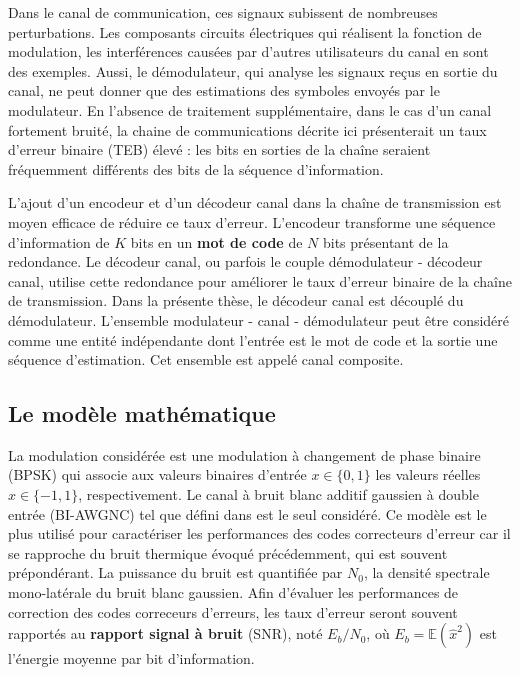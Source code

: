 
Dans le canal de communication, ces signaux subissent de nombreuses perturbations. Les composants circuits électriques qui réalisent la fonction de modulation, les interférences causées par d'autres utilisateurs du canal en sont des exemples. Aussi, le démodulateur, qui analyse les signaux reçus en sortie du canal, ne peut donner que des estimations des symboles envoyés par le modulateur. En l'absence de traitement supplémentaire, dans le cas d'un canal fortement bruité, la chaine de communications décrite ici présenterait un taux d'erreur binaire (TEB) élevé : les bits en sorties de la chaîne seraient fréquemment différents des bits de la séquence d'information.

L'ajout d'un encodeur et d'un décodeur canal dans la chaîne de transmission est moyen efficace de réduire ce taux d'erreur. L'encodeur transforme une séquence d'information de $K$ bits en un \textbf{mot de code} de $N$ bits présentant de la redondance. Le décodeur canal, ou parfois le couple démodulateur - décodeur canal, utilise cette redondance pour améliorer le taux d'erreur binaire de la chaîne de transmission. Dans la présente thèse, le décodeur canal est découplé du démodulateur. L'ensemble modulateur - canal - démodulateur peut être considéré comme une entité indépendante dont l'entrée est le mot de code et la sortie une séquence d'estimation. Cet ensemble est appelé canal composite.

\subsection{Le modèle mathématique}
La modulation considérée est une modulation à changement de phase binaire (BPSK) qui associe aux valeurs binaires d'entrée $x\in\{0,1\}$ les valeurs réelles $\hat{x}\in\{-1,1\}$, respectivement.
Le canal à bruit blanc additif gaussien à double entrée (BI-AWGNC) tel que défini dans \cite[Section~1.5.1.3]{ryan2009channel} est le seul considéré. Ce modèle est le plus utilisé pour caractériser les performances des codes correcteurs d'erreur car il se rapproche du bruit thermique évoqué précédemment, qui est souvent prépondérant. La puissance du bruit est quantifiée par $N_0$, la densité spectrale mono-latérale du bruit blanc gaussien. Afin d'évaluer les performances de correction des codes correceurs d'erreurs, les taux d'erreur seront souvent rapportés au \textbf{rapport signal à bruit} (SNR), noté $E_b/N_0$, où $E_b=\mathbb{E}(\hat{x}^2)$ est l'énergie moyenne par bit d'information.

